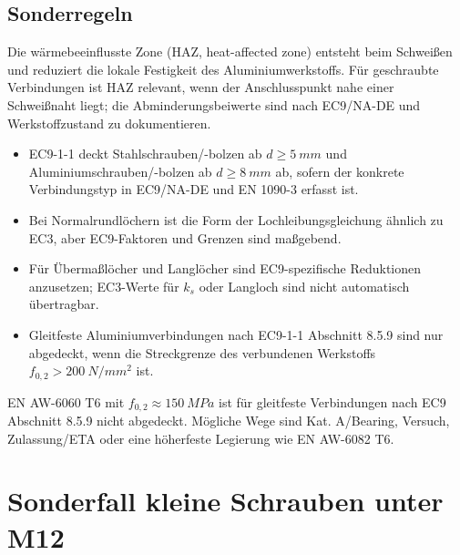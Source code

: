 \documentclass[10pt,a4paper]{article}
\begin{document}
\subsection{Sonderregeln}
Die wärmebeeinflusste Zone (HAZ, heat-affected zone) entsteht beim Schweißen und reduziert die lokale Festigkeit des Aluminiumwerkstoffs. Für geschraubte Verbindungen ist HAZ relevant, wenn der Anschlusspunkt nahe einer Schweißnaht liegt; die Abminderungsbeiwerte sind nach EC9/NA-DE und Werkstoffzustand zu dokumentieren.

\begin{itemize}
\item EC9-1-1 deckt Stahlschrauben/-bolzen ab $d\geq\SI{5}{mm}$ und Aluminiumschrauben/-bolzen ab $d\geq\SI{8}{mm}$ ab, sofern der konkrete Verbindungstyp in EC9/NA-DE und EN 1090-3 erfasst ist.
\item Bei Normalrundlöchern ist die Form der Lochleibungsgleichung ähnlich zu EC3, aber EC9-Faktoren und Grenzen sind maßgebend.
\item Für Übermaßlöcher und Langlöcher sind EC9-spezifische Reduktionen anzusetzen; EC3-Werte für $k_s$ oder Langloch sind nicht automatisch übertragbar.
\item Gleitfeste Aluminiumverbindungen nach EC9-1-1 Abschnitt 8.5.9 sind nur abgedeckt, wenn die Streckgrenze des verbundenen Werkstoffs $f_{0,2}>\SI{200}{N/mm^2}$ ist.
\end{itemize}

\begin{warnbox}
EN AW-6060 T6 mit $f_{0,2}\approx\SI{150}{MPa}$ ist für gleitfeste Verbindungen nach EC9 Abschnitt 8.5.9 nicht abgedeckt. Mögliche Wege sind Kat. A/Bearing, Versuch, Zulassung/ETA oder eine höherfeste Legierung wie EN AW-6082 T6.
\end{warnbox}

\section{Sonderfall kleine Schrauben unter M12}
\end{document}
